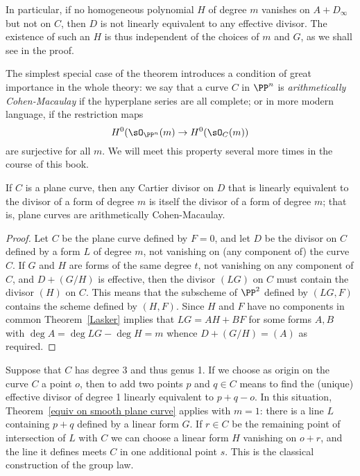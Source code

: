 In particular, if no homogeneous polynomial $H$ of degree $m$ vanishes on  $A + D_\infty$ but not on $C$, then $D$ is not linearly equivalent to any effective divisor. The existence of such an $H$ is thus independent of the choices of $m$ and $G$, as we shall see in the proof.

The simplest special case of the theorem introduces a condition of great importance in the whole theory: we say that a curve $C$ in $\PP^{n}$ is \emph{arithmetically Cohen-Macaulay} if the hyperplane series
are all complete; or in more modern language, if the restriction maps
$$
H^{0}(\sO_{\PP^{n}}(m) \to H^{0}(\sO_{C}(m))
$$
are surjective for all $m$. We will meet this property several more times in the course of this book.

\begin{proposition}\label {completeness of hyperplanes on plane curve}
If $C$ is a plane curve, then any Cartier divisor on $D$ that is linearly equivalent to the divisor of
a form of degree $m$ is itself the divisor of a form of degree $m$; that is, plane curves are
arithmetically Cohen-Macaulay.
\end{proposition}

\begin{proof}
Let $C$ be the plane curve defined by $F=0$, and let $D$ be the divisor on $C$ defined by a form $L$
of degree $m$, not vanishing on (any component of) the curve $C$. If $G$ and $H$ are forms of the same degree $t$, 
not vanishing on any component of $C$,
and $D+(G/H)$ is effective, then the divisor $(LG)$  on $C$ must contain the divisor $(H)$ on $C$.
This means that the subscheme of $\PP^{2}$ defined by $(LG,F)$ contains the scheme defined 
by $(H,F)$. Since $H$ and $F$ have no components in common Theorem~\ref{Lasker} implies
that $LG = AH+BF$  for some forms $A,B$ with $\deg A = \deg LG -\deg H = m$ whence $D+(G/H) = (A)$
as required.
\end{proof}

\begin{example}
Suppose that $C$ has degree 3 and thus genus 1. If we choose as origin on the curve $C$ a point $o$, then to add two points $p$ and $q \in C$ means to find the (unique) effective divisor of degree 1 linearly equivalent to $p + q - o$. In this situation, Theorem~\ref{equiv on smooth plane curve} applies with $m=1$: there is a line $L$ 
containing $p+q$ defined by a linear form $G$. If $r \in C$ be the remaining point of intersection of $L$ with $C$ we can choose a linear form $H$ vanishing on $o+r$, and the line it defines meets $C$
in one additional point $s$. This is the classical construction of the group law.
\end{example}


